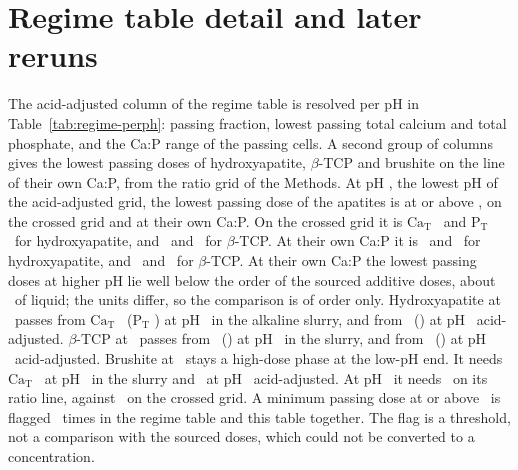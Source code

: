 \section{Regime table detail and later reruns}\label{si:regime}

The acid-adjusted column of the regime table is resolved per pH in Table~\ref{tab:regime-perph}: passing fraction, lowest passing total calcium and total phosphate, and the Ca:P range of the passing cells. %
A second group of columns gives the lowest passing doses of hydroxyapatite, $\beta$-TCP and brushite on the line of their own Ca:P, from the ratio grid of the Methods. %
At pH \NumRegPhGridFourFive, the lowest pH of the acid-adjusted grid, the lowest passing dose of the apatites is at or above \NumRegHighDose, on the crossed grid and at their own Ca:P. %
On the crossed grid it is $\mathrm{Ca_T}$ \NumRegPhMinCaHapFourFive\ and $\mathrm{P_T}$ \NumRegPhMinPHapFourFive\ for hydroxyapatite, and \NumRegPhMinCaBtcpFourFive\ and \NumRegPhMinPBtcpFourFive\ for $\beta$-TCP. %
At their own Ca:P it is \NumRegPhStoichCaHapFourFive\ and \NumRegPhStoichPHapFourFive\ for hydroxyapatite, and \NumRegPhStoichCaBtcpFourFive\ and \NumRegPhStoichPBtcpFourFive\ for $\beta$-TCP. %
At their own Ca:P the lowest passing doses at higher pH lie well below the order of the sourced additive doses, about \NumDoseMolPerKgLiquid\ of liquid; the units differ, so the comparison is of order only. %
Hydroxyapatite at \NumRatioHap\ passes from $\mathrm{Ca_T}$ \NumRegOwnHapSlurryCa\ ($\mathrm{P_T}$ \NumRegOwnHapSlurryP) at pH \NumRegOwnHapSlurryPh\ in the alkaline slurry, and from \NumRegOwnHapAcidCa\ (\NumRegOwnHapAcidP) at pH \NumRegOwnHapAcidPh\ acid-adjusted. %
$\beta$-TCP at \NumRatioTcp\ passes from \NumRegOwnBtcpSlurryCa\ (\NumRegOwnBtcpSlurryP) at pH \NumRegOwnBtcpSlurryPh\ in the slurry, and from \NumRegOwnBtcpAcidCa\ (\NumRegOwnBtcpAcidP) at pH \NumRegOwnBtcpAcidPh\ acid-adjusted. %
Brushite at \NumRatioBrushite\ stays a high-dose phase at the low-pH end. %
It needs $\mathrm{Ca_T}$ \NumRegOwnBrushiteSlurryCa\ at pH \NumRegOwnBrushiteSlurryPh\ in the slurry and \NumRegOwnBrushiteAcidCa\ at pH \NumRegOwnBrushiteAcidPh\ acid-adjusted. %
At pH \NumRegPhGridFourFive\ it needs \NumRegPhStoichCaBrushiteFourFive\ on its ratio line, against \NumRegPhMinCaBrushiteFourFive\ on the crossed grid. %
A minimum passing dose at or above \NumRegHighDose\ is flagged \NumRegHighDoseStatements\ times in the regime table and this table together. %
The flag is a threshold, not a comparison with the sourced doses, which could not be converted to a concentration. %

